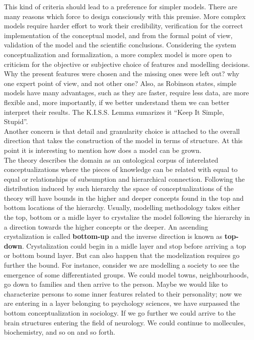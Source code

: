 \documentclass[11pt,oneside,a4paper,openright]{report}
\begin{document}
This kind of criteria should lead to a preference for simpler models. There are many reasons which force to design consciously with this premise. More complex models require harder effort to work their credibility, verification for the correct implementation of the conceptual model, and from the formal point of view, validation of the model and the scientific conclusions. Considering the system conceptualization and formalization, a more complex model is more open to criticism for the objective or subjective choice of features and modelling decisions. Why the present features were chosen and the missing ones were left out? why one expert point of view, and not other one? Also, as Robinson \cite{Robinson2008} states, simple models have many advantages, such as they are faster, require less data, are more flexible and, more importantly, if we better understand them we can better interpret their results. The K.I.S.S. Lemma sumarizes it ``Keep It Simple, Stupid''.\\
Another concern is that detail and granularity choice is attached to the overall direction that takes the construction of the model in terms of structure. At this point it is interesting to mention how does a model can be grown.\\
The theory describes the domain as an ontological corpus of interelated conceptualizations where the pieces of knowledge can be related with equal to equal or relationships of subsumption and hierarchical connection. Following the distribution induced by such hierarchy the space of conceptualizations of the theory will have bounds in the higher and deeper concepts found in the top and bottom locations of the hierarchy. Usually, modelling methodology takes either the top, bottom or a midle layer to crystalize the model following the hierarchy in a direction towards the higher concepts or the deeper. An ascending crystalization is called \textbf{bottom-up} and the inverse direction is known as \textbf{top-down}. Crystalization could begin in a midle layer and stop before arriving a top or bottom bound layer. But can also happen that the modelization requires go further the bound. For instance, consider we are modelling a society to see the emergence of some differentiated groups. We could model towns, neighbourhoods, go down to families and then arrive to the person. Maybe we would like to characterize persons to some inner features related to their personality; now we are entering in a layer belonging to psychology sciences, we have surpassed the bottom conceptualization in sociology. If we go further we could arrive to the brain structures entering the field of neurology. We could continue to mollecules, biochemistry, and so on and so forth.\\
\end{document}
